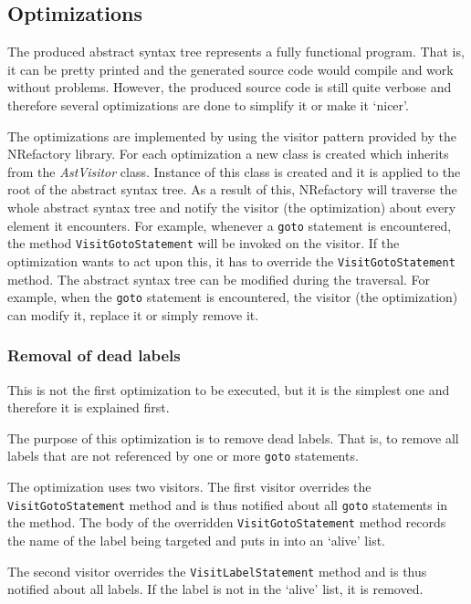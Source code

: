 \documentclass[12pt,twoside,notitlepage]{report}
\begin{document}
\subsection{Optimizations}

The produced abstract syntax tree represents a fully functional program.
That is, it can be pretty printed and the generated source code would 
compile and work without problems.  
However, the produced source code is still quite verbose and
therefore several optimizations are done to simplify it or make it `nicer'.

The optimizations are implemented by using the visitor pattern
provided by the NRefactory library.  For each optimization
a new class is created which inherits from the \emph{AstVisitor}
class.  Instance of this class is created and it is applied to 
the root of the abstract syntax tree.
As a result of this, NRefactory will traverse the whole abstract
syntax tree and notify the visitor (the optimization) about
every element it encounters.  For example, whenever a \verb|goto|
statement is encountered, the method \verb|VisitGotoStatement|
will be invoked on the visitor.  If the optimization wants to
act upon this, it has to override the \verb|VisitGotoStatement| method.
The abstract syntax tree can be modified during the traversal.
For example, when the \verb|goto| statement is encountered,
the visitor (the optimization) can modify it, replace it or simply
remove it.

\subsubsection{Removal of dead labels}
        \label{Removal of dead labels}

This is not the first optimization to be executed, but it is the 
simplest one and therefore it is explained first.

The purpose of this optimization is to remove dead labels.
That is, to remove all labels that are not referenced by one
or more \verb|goto| statements.

The optimization uses two visitors.  The first visitor overrides
the \verb|VisitGotoStatement| method and is thus notified about
all \verb|goto| statements in the method.  The body of the overridden
\verb|VisitGotoStatement| method records the name of the label
being targeted and puts in into an `alive' list.

The second visitor overrides the \verb|VisitLabelStatement|
method and is thus notified about all labels.  If the label
is not in the `alive' list, it is removed.
\end{document}
